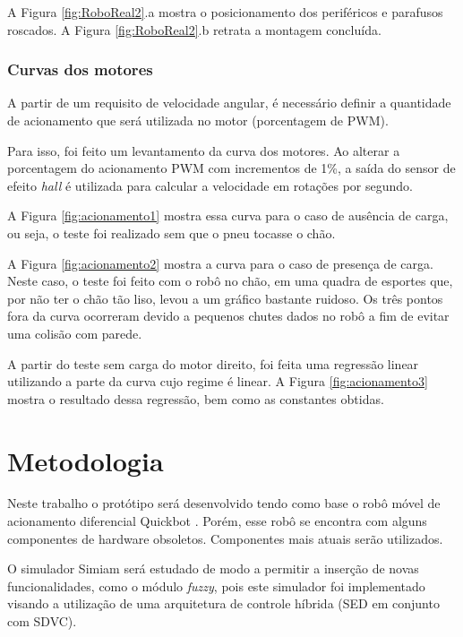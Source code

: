 	A Figura \ref{fig:RoboReal2}.a mostra o posicionamento dos periféricos e parafusos 
	roscados. A Figura \ref{fig:RoboReal2}.b retrata a montagem concluída.
	
	
	
\subsubsection{Curvas dos motores}

	A partir de um requisito de velocidade angular, é necessário definir a quantidade de 
	acionamento que será utilizada no motor (porcentagem de PWM).
	
	Para isso, foi feito um levantamento da curva dos motores. Ao alterar a porcentagem do
	acionamento PWM com incrementos de 1\%, a saída do sensor de efeito \textit{hall} é 
	utilizada para calcular a velocidade em rotações por segundo. 
	
	A Figura \ref{fig:acionamento1} mostra essa curva para o caso de ausência de carga, ou
	seja, o teste foi realizado sem que o pneu tocasse o chão. 
	
	
	
	A Figura \ref{fig:acionamento2} mostra a curva para o caso de presença de carga. Neste
	caso, o teste foi feito com o robô no chão, em uma quadra de esportes que, por não ter 
	o chão tão liso, levou a um gráfico bastante ruidoso. Os três pontos fora da curva 
	ocorreram devido a pequenos chutes dados no robô a fim de evitar uma colisão com parede.
	
	
	
	A partir do teste sem carga do motor direito, foi feita uma regressão linear utilizando 
	a parte da curva cujo regime é linear. A Figura \ref{fig:acionamento3} mostra o resultado 
	dessa regressão, bem como as constantes obtidas.
	
	
	
\section{Metodologia}

Neste trabalho o protótipo será desenvolvido tendo como base o robô móvel de
acionamento diferencial Quickbot \cite{QuickBot}. Porém, esse robô se encontra
com alguns componentes de hardware obsoletos. Componentes mais atuais serão
utilizados.

O simulador Simiam será estudado de modo a permitir a inserção de novas
funcionalidades, como o módulo \textit{fuzzy}, pois este simulador foi
implementado visando a utilização de uma arquitetura de controle híbrida (SED em conjunto
com SDVC). 


